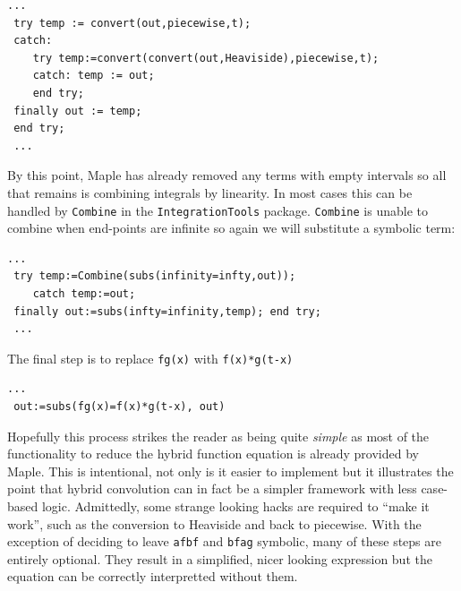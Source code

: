 \begin{lstlisting}[frame=single]
 ...
 try temp := convert(out,piecewise,t);
 catch: 
    try temp:=convert(convert(out,Heaviside),piecewise,t);
    catch: temp := out;
    end try;  
 finally out := temp; 
 end try;
 ...
\end{lstlisting}


By this point, Maple has already removed any terms with empty intervals so all that remains is combining integrals by 
linearity.
In most cases this can be handled by \texttt{Combine} in the \texttt{IntegrationTools} package.
\texttt{Combine} is unable to combine when end-points are infinite so again we will substitute a symbolic term:

\pagebreak

\begin{lstlisting}[frame=single]
 ...
 try temp:=Combine(subs(infinity=infty,out));
    catch temp:=out;
 finally out:=subs(infty=infinity,temp); end try;
 ...
\end{lstlisting}


The final step is to replace \texttt{fg(x)} with \texttt{f(x)*g(t-x)}

\begin{lstlisting}[frame=single]
 ...
 out:=subs(fg(x)=f(x)*g(t-x), out)
\end{lstlisting}


Hopefully this process strikes the reader as being quite \emph{simple} as most of the functionality to reduce 
the hybrid function equation is already provided by Maple. 
This is intentional, not only is it easier to implement but it illustrates the point that hybrid convolution can in fact be  a
simpler framework with less case-based logic.
Admittedly, some strange looking hacks are required to ``make it work'', such as the conversion to Heaviside and back 
to piecewise.
With the exception of deciding to leave \texttt{afbf} and \texttt{bfag} symbolic, many of these steps are entirely optional.
They result in a simplified, nicer looking expression but the equation can be correctly interpretted without them.


\newpage